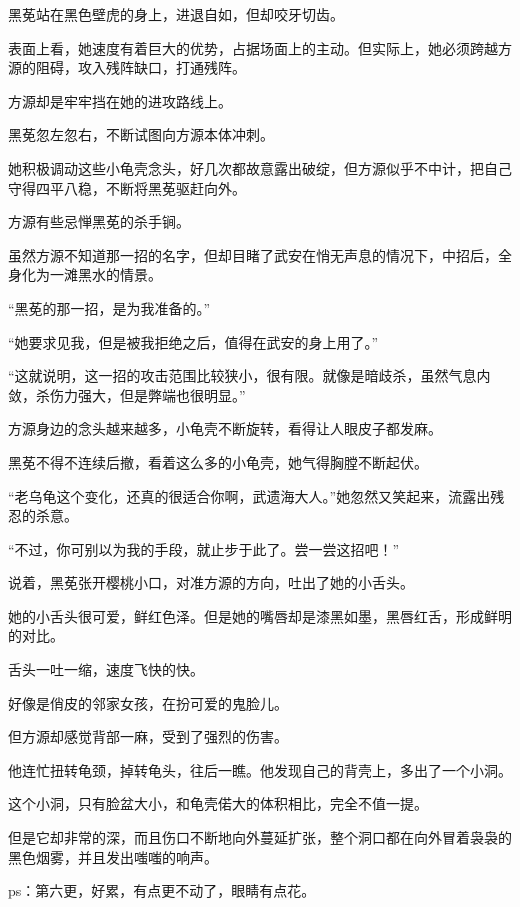 \begin{this_body}
黑莬站在黑色壁虎的身上，进退自如，但却咬牙切齿。

表面上看，她速度有着巨大的优势，占据场面上的主动。但实际上，她必须跨越方源的阻碍，攻入残阵缺口，打通残阵。

方源却是牢牢挡在她的进攻路线上。

黑莬忽左忽右，不断试图向方源本体冲刺。

她积极调动这些小龟壳念头，好几次都故意露出破绽，但方源似乎不中计，把自己守得四平八稳，不断将黑莬驱赶向外。

方源有些忌惮黑莬的杀手锏。

虽然方源不知道那一招的名字，但却目睹了武安在悄无声息的情况下，中招后，全身化为一滩黑水的情景。

“黑莬的那一招，是为我准备的。”

“她要求见我，但是被我拒绝之后，值得在武安的身上用了。”

“这就说明，这一招的攻击范围比较狭小，很有限。就像是暗歧杀，虽然气息内敛，杀伤力强大，但是弊端也很明显。”

方源身边的念头越来越多，小龟壳不断旋转，看得让人眼皮子都发麻。

黑莬不得不连续后撤，看着这么多的小龟壳，她气得胸膛不断起伏。

“老乌龟这个变化，还真的很适合你啊，武遗海大人。”她忽然又笑起来，流露出残忍的杀意。

“不过，你可别以为我的手段，就止步于此了。尝一尝这招吧！”

说着，黑莬张开樱桃小口，对准方源的方向，吐出了她的小舌头。

她的小舌头很可爱，鲜红色泽。但是她的嘴唇却是漆黑如墨，黑唇红舌，形成鲜明的对比。

舌头一吐一缩，速度飞快的快。

好像是俏皮的邻家女孩，在扮可爱的鬼脸儿。

但方源却感觉背部一麻，受到了强烈的伤害。

他连忙扭转龟颈，掉转龟头，往后一瞧。他发现自己的背壳上，多出了一个小洞。

这个小洞，只有脸盆大小，和龟壳偌大的体积相比，完全不值一提。

但是它却非常的深，而且伤口不断地向外蔓延扩张，整个洞口都在向外冒着袅袅的黑色烟雾，并且发出嗤嗤的响声。

ps：第六更，好累，有点更不动了，眼睛有点花。

\end{this_body}

